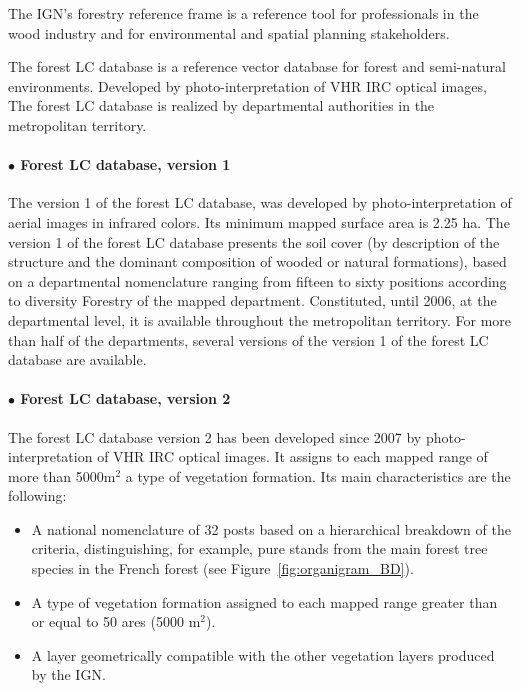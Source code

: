 The IGN's forestry reference frame is a reference tool for professionals in the wood industry and for environmental and spatial planning stakeholders.

The forest LC database is a reference vector database for forest and semi-natural environments. Developed by photo-interpretation of VHR IRC optical images, The forest LC database is realized by departmental authorities in the metropolitan territory.

\paragraph{$\bullet$ Forest LC database, version 1 \\}
The version 1 of the forest LC database, was developed by photo-interpretation of aerial images in infrared colors.
Its minimum mapped surface area is 2.25 ha.
The version 1 of the forest LC database presents the soil cover (by description of the structure and the dominant composition of wooded or natural formations), based on a departmental nomenclature ranging from fifteen to sixty positions according to diversity Forestry of the mapped department.
Constituted, until 2006, at the departmental level, it is available throughout the metropolitan territory.
For more than half of the departments, several versions of the version 1 of the forest LC database are available.

\paragraph{$\bullet$ Forest LC database, version 2 \\}
The forest LC database version 2 has been developed since 2007 by photo-interpretation of VHR IRC optical images.
It assigns to each mapped range of more than 5000m$^{2}$ a type of vegetation formation.
Its main characteristics are the following:
\begin{itemize}
\item A national nomenclature of 32 posts based on a hierarchical breakdown of the criteria, distinguishing, for example, pure stands from the main forest tree species in the French forest (see Figure~\ref{fig:organigram_BD}).
\item A type of vegetation formation assigned to each mapped range greater than or equal to 50 ares (5000 m$^{2}$).
\item A layer geometrically compatible with the other vegetation layers produced by the IGN.
\end{itemize}

